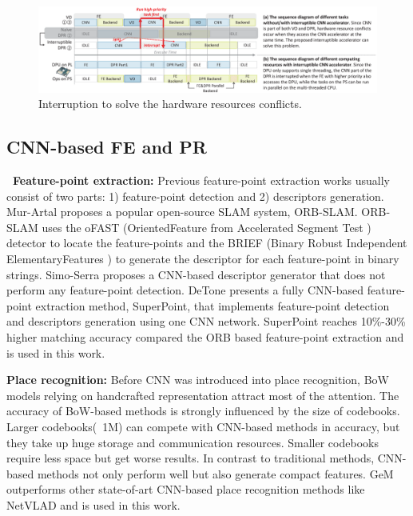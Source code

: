 
\label{sec:relate}

\begin{figure}[t]
	\centering
	\includegraphics[width=0.99\linewidth]{fig/interDPR.eps}
    \caption{Interruption to solve the hardware resources conflicts.  
    }
	\label{fig:interDPR}
\end{figure}

\subsection{ CNN-based FE and PR }

\textbf{\quad \ Feature-point extraction:} Previous feature-point extraction works usually consist of two parts: 1) feature-point detection and 2) descriptors generation.
Mur-Artal \cite{Mur-Artal:2017281} proposes a popular open-source SLAM system, ORB-SLAM. ORB-SLAM uses the oFAST (OrientedFeature from Accelerated Segment Test \cite{biadgie2014feature}) detector to locate the feature-points and the BRIEF (Binary Robust Independent ElementaryFeatures \cite{calonder2010brief}) to generate the descriptor for each feature-point in binary strings. 
Simo-Serra \cite{simo2015discriminative} proposes a CNN-based descriptor generator that does not perform any feature-point detection. 
DeTone \cite{detone2018superpoint} presents a fully CNN-based feature-point extraction method, SuperPoint, that implements feature-point detection and descriptors generation using one CNN network. SuperPoint\cite{detone2018superpoint} reaches 10\%-30\% higher matching accuracy compared the ORB based feature-point extraction \cite{Mur-Artal:2017281} and is used in this work.

\textbf{Place recognition:} Before CNN was introduced into place recognition, BoW \cite{small_1} models relying on handcrafted representation attract most of the attention. The accuracy of BoW-based methods is strongly influenced by the size of codebooks. Larger codebooks(~1M) \cite{large_1, large_2} can compete with CNN-based methods in accuracy, but they take up huge storage and communication resources. Smaller codebooks\cite{small_1, small_2} require less space but get worse results. In contrast to traditional methods, CNN-based methods not only perform well but also generate compact features. GeM \cite{radenovic2018fine} outperforms other state-of-art CNN-based place recognition methods like NetVLAD \cite{arandjelovic2016netvlad} and is used in this work.



